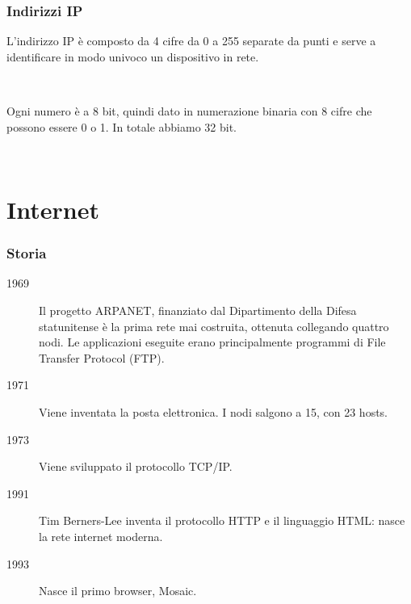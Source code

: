\documentclass[]{beamer}
\begin{document}
\begin{frame}
\frametitle{Indirizzi IP}
L'indirizzo IP è composto da \alert<1>{4 cifre da 0 a 255 separate da punti} e serve a identificare in modo univoco un dispositivo in rete.\pause

~

Ogni numero è a 8 bit, quindi dato in numerazione binaria con 8 cifre che possono essere 0 o 1. In totale abbiamo \alert<2>{32 bit}.\pause

~

  

\end{frame}



\section{Internet}


\begin{frame}
\frametitle{Storia}
\begin{description}
  \item[1969] Il progetto ARPANET, finanziato dal Dipartimento della Difesa statunitense è la prima rete mai costruita, ottenuta collegando quattro nodi. Le applicazioni eseguite erano principalmente programmi di File Transfer Protocol (FTP).\pause
  \item[1971] Viene inventata la posta elettronica. I nodi salgono a 15, con 23 hosts.\pause
  \item[1973] Viene sviluppato il protocollo TCP/IP.\pause
  \item[1991] Tim Berners-Lee inventa il protocollo HTTP e il linguaggio HTML: nasce la rete internet moderna.\pause
  \item[1993] Nasce il primo browser, Mosaic.
\end{description}
\end{frame}
\end{document}
